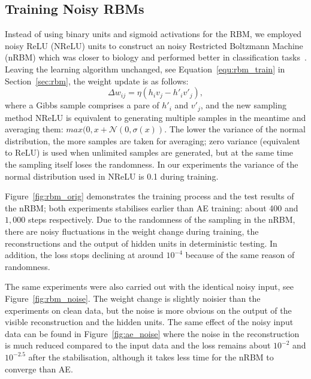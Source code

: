 \subsection[Noisy RBMs]{Training Noisy RBMs}
\label{subsec:exp_RBM}
Instead of using binary units and sigmoid activations for the RBM, we employed noisy ReLU (NReLU) units to construct an noisy Restricted Boltzmann Machine (nRBM) which was closer to biology and performed better in classification tasks~\citep{nair2010rectified}.
Leaving the learning algorithm unchanged, see Equation~\ref{equ:rbm_train} in Section~\ref{sec:rbm}, the weight update is as follows:
\begin{equation}
\Delta w_{ij} = \eta (h_iv_j - h'_iv'_j),
\label{equ:rbm}
\end{equation} 
where a Gibbs sample comprises a pare of $h'_i$ and $v'_j$, and the new sampling method NReLU is equivalent to generating multiple samples in the meantime and averaging them: $max(0, x+\mathcal{N}(0, \sigma(x))$.
The lower the variance of the normal distribution, the more samples are taken for averaging;
zero variance (equivalent to ReLU) is used when unlimited samples are generated, but at the same time the sampling itself loses the randomness.
In our experiments the variance of the normal distribution used in NReLU is 0.1 during training.


Figure~\ref{fig:rbm_orig} demonstrates the training process and the test results of the nRBM; both experiments stabilises earlier than AE training: about 400 and $1,000$ steps respectively.
Due to the randomness of the sampling in the nRBM, there are noisy fluctuations in the weight change during training, the reconstructions and the output of hidden units in deterministic testing.
In addition, the loss stops declining at around $10^{-4}$ because of the same reason of randomness.

The same experiments were also carried out with the identical noisy input, see Figure~\ref{fig:rbm_noise}.
The weight change is slightly noisier than the experiments on clean data, but the noise is more obvious on the output of the visible reconstruction and the hidden units.
The same effect of the noisy input data can be found in Figure~\ref{fig:ae_noise} where the noise in the reconstruction is much reduced compared to the input data and the loss remains about $10^{-2}$ and $10^{-2.5}$ after the stabilisation, although it takes less time for the nRBM to converge than AE.


